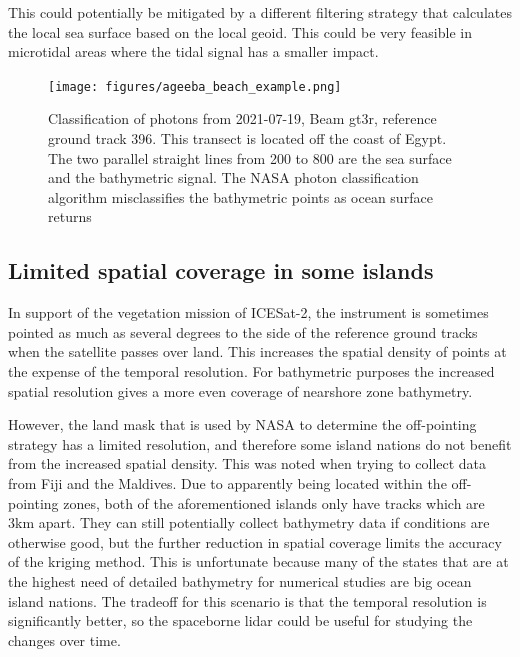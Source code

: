 This could potentially be mitigated by a different filtering strategy that calculates the local sea surface based on the local geoid. This could be very feasible in microtidal areas where the tidal signal has a smaller impact.

\begin{figure}[htbp]
    \centering
    \texttt{[image: figures/ageeba\_beach\_example.png]}
    \caption[Misclassification errors example]{Classification of photons from 2021-07-19, Beam gt3r, reference ground track 396. This transect is located off the coast of Egypt. The two parallel straight lines from 200 to 800 are the sea surface and the bathymetric signal. The NASA photon classification algorithm misclassifies the bathymetric points as ocean surface returns}
    \label{fig:ageeba_bad_classes}
\end{figure}


\subsection{Limited spatial coverage in some islands}

In support of the vegetation mission of ICESat-2, the instrument is sometimes pointed as much as several degrees to the side of the reference ground tracks when the satellite passes over land. This increases the spatial density of points at the expense of the temporal resolution. For bathymetric purposes the increased spatial resolution gives a more even coverage of nearshore zone bathymetry. 

However, the land mask that is used by NASA to determine the off-pointing strategy has a limited resolution, and therefore some island nations do not benefit from the increased spatial density. This was noted when trying to collect data from Fiji and the Maldives. Due to apparently being located within the off-pointing zones, both of the aforementioned islands only have tracks which are 3km apart. They can still potentially collect bathymetry data if conditions are otherwise good, but the further reduction in spatial coverage limits the accuracy of the kriging method. This is unfortunate because many of the states that are at the highest need of detailed bathymetry for numerical studies are big ocean island nations. The tradeoff for this scenario is that the temporal resolution is significantly better, so the spaceborne lidar could be useful for studying the changes over time. 

